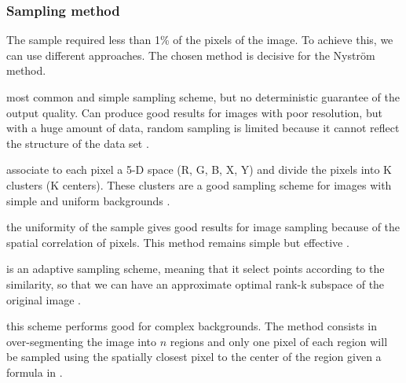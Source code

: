 \documentclass[]{article}
\begin{document}
\subsubsection{Sampling method}
The sample required less than 1\% of the pixels of the image. To achieve this, we can use different approaches. The chosen method is decisive for the Nystr\"om method.
\begin{description}[align=left]
 \item [Random sampling (RS)] most common and simple sampling scheme, but no deterministic guarantee of the output quality. Can produce good results for images with poor resolution, but with a huge amount of data, random sampling is limited because it cannot reflect the structure of the data set \cite{zhan_improved_2017}.
 \item [K-means sampling (KS)] associate to each pixel a 5-D space (R, G, B, X, Y) and divide the pixels into K clusters (K centers). These clusters are a good sampling scheme for images with simple and uniform backgrounds \cite{kao_sampling_2012} \cite{zhang_improved_2008}.
 \item [Uniform spatially sampling] the uniformity of the sample gives good results for image sampling because of the spatial correlation of pixels. This method remains simple but effective \cite{glide_2014}.
 \item [Incremental sampling (INS)] is an adaptive sampling scheme, meaning that it select points according to the similarity, so that we can have an approximate optimal rank-k subspace of the original image \cite{zhan_improved_2017}.
 \item [Mean-shift segmentation-based sampling] this scheme performs good for complex backgrounds. The method consists in over-segmenting the image into \(n\) regions and only one pixel of each region will be sampled using the spatially closest pixel to the center of the region given a formula in \cite{kao_sampling_2012}.
\end{description}
\end{document}
